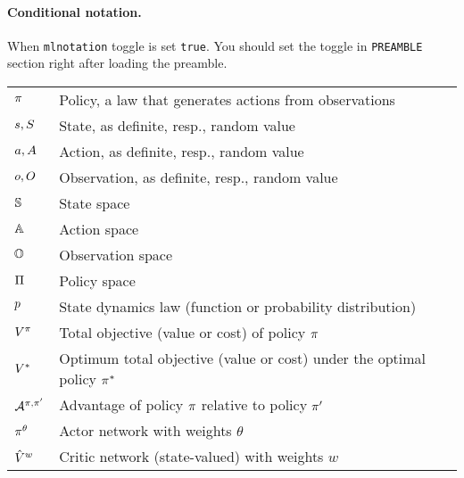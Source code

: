 \documentclass[12pt,twoside]{../../mitthesis}
\begin{document}
\paragraph{Conditional notation.}
When \texttt{mlnotation} toggle is set \texttt{true}.
You should set the toggle in \texttt{PREAMBLE} section right after loading the preamble.
\noindent
\begin{tabularx}{0.97\textwidth}{ |p{}|p{}| }  
\hline
$\pi$ & Policy, a law that generates actions from observations \\ 
$s, S$ & State, as definite, resp., random value \\ 
$a, A$ & Action, as definite, resp., random value \\ 
$o, O$ & Observation, as definite, resp., random value \\ 
$\mathbb S$ & State space \\
$\mathbb A$ & Action space \\
$\mathbb O$ & Observation space \\
$\Pi$ & Policy space \\
$p$ & State dynamics law (function or probability distribution) \\ 
$V^\pi$ & Total objective (value or cost) of policy $\pi$ \\
$V^*$ & Optimum total objective (value or cost) under the optimal policy $\pi^*$ \\
$\mathcal A^{\pi,\pi'}$ & Advantage of policy $\pi$ relative to policy $\pi'$ \\
$\pi^\theta$ & Actor network with weights $\theta$ \\
$\hat {V}^w$ & Critic network (state-valued) with weights $w$ \\
\hline
\end{tabularx}
\end{document}
